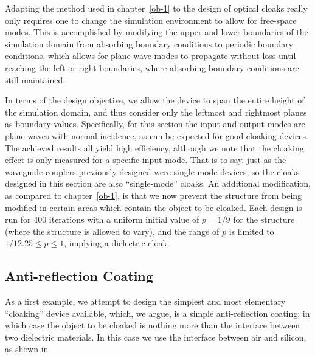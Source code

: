 Adapting the method used in chapter~\ref{ob-1} to the design of optical cloaks
    really only requires one to change the simulation environment
    to allow for free-space modes.
This is accomplished by modifying the upper and lower boundaries
    of the simulation domain from absorbing boundary conditions
    to periodic boundary conditions,
    which allows for plane-wave modes to propagate without loss
    until reaching the left or right boundaries,
    where absorbing boundary conditions are still maintained.

In terms of the design objective, 
    we allow the device to span the entire height of the simulation domain,
    and thus consider only the leftmost and rightmost planes as boundary values.
Specifically, for this section the input and output modes are plane waves
    with normal incidence, 
    as can be expected for good cloaking devices.
The achieved results all yield high efficiency,
    although we note that the cloaking effect is only measured
    for a specific input mode.
That is to say, just as the waveguide couplers previously designed
    were single-mode devices,
    so the cloaks designed in this section are also ``single-mode'' cloaks.
An additional modification, as compared to chapter~\ref{ob-1}, is that
    we now prevent the structure from being modified in certain areas
    which contain the object to be cloaked.
Each design is run for 400 iterations
    with a uniform initial value of $p = 1/9$ for the structure
    (where the structure is allowed to vary),
    and the range of $p$ is limited to $1/12.25 \le p \le 1$,
    implying a dielectric cloak.
    
    
    
\subsection{Anti-reflection Coating}

As a first example,
    we attempt to design the simplest and most elementary ``cloaking'' device available,
    which, we argue, is a simple anti-reflection coating;
    in which case the object to be cloaked is nothing more than
    the interface between two dielectric materials.
In this case we use the interface between air and silicon, as shown in 


